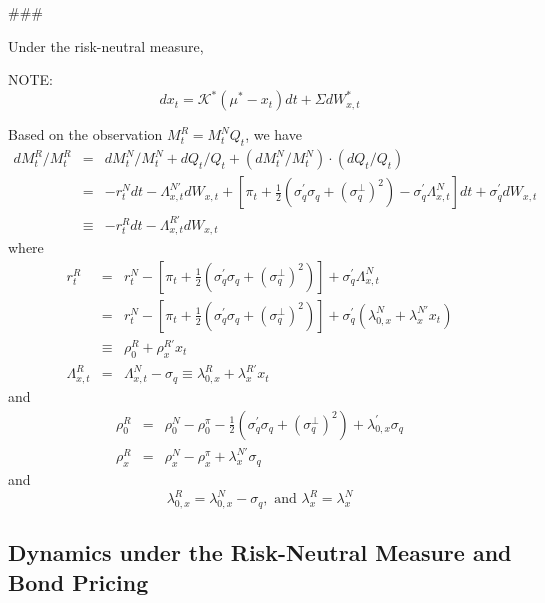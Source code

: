 \documentclass{article}
\begin{document}
\#\#\#

Under the risk-neutral measure,

NOTE:\ 
\begin{equation*}
dx_{t}=\mathcal{K}^{\ast }\left( \mu ^{\ast }-x_{t}\right) dt+\Sigma
dW_{x,t}^{\ast }
\end{equation*}

Based on the observation $M_{t}^{R}=M_{t}^{N}Q_{t}$, we have%
\begin{eqnarray*}
dM_{t}^{R}/M_{t}^{R} &=&dM_{t}^{N}/M_{t}^{N}+dQ_{t}/Q_{t}+\left(
dM_{t}^{N}/M_{t}^{N}\right) \cdot \left( dQ_{t}/Q_{t}\right) \\
&=&-r_{t}^{N}dt-\Lambda _{x,t}^{N\prime }dW_{x,t}+\left[ \pi _{t}+\frac{1}{2}%
\left( \sigma _{q}^{\prime }\sigma _{q}+\left( \sigma _{q}^{\bot }\right)
^{2}\right) -\sigma _{q}^{\prime }\Lambda _{x,t}^{N}\right] dt+\sigma
_{q}^{\prime }dW_{x,t} \\
&\equiv &-r_{t}^{R}dt-\Lambda _{x,t}^{R\prime }dW_{x,t}
\end{eqnarray*}%
where 
\begin{eqnarray*}
r_{t}^{R} &=&r_{t}^{N}-\left[ \pi _{t}+\frac{1}{2}\left( \sigma _{q}^{\prime
}\sigma _{q}+\left( \sigma _{q}^{\bot }\right) ^{2}\right) \right] +\sigma
_{q}^{\prime }\Lambda _{x,t}^{N} \\
&=&r_{t}^{N}-\left[ \pi _{t}+\frac{1}{2}\left( \sigma _{q}^{\prime }\sigma
_{q}+\left( \sigma _{q}^{\bot }\right) ^{2}\right) \right] +\sigma
_{q}^{\prime }\left( \lambda _{0,x}^{N}+\lambda _{x}^{N\prime }x_{t}\right)
\\
&\equiv &\rho _{0}^{R}+\rho _{x}^{R\prime }x_{t} \\
\Lambda _{x,t}^{R} &=&\Lambda _{x,t}^{N}-\sigma _{q}\equiv \lambda
_{0,x}^{R}+\lambda _{x}^{R\prime }x_{t}
\end{eqnarray*}%
and%
\begin{eqnarray*}
\rho _{0}^{R} &=&\rho _{0}^{N}-\rho _{0}^{\pi }-\frac{1}{2}\left( \sigma
_{q}^{\prime }\sigma _{q}+\left( \sigma _{q}^{\bot }\right) ^{2}\right)
+\lambda _{0,x}^{\prime }\sigma _{q} \\
\rho _{x}^{R} &=&\rho _{x}^{N}-\rho _{x}^{\pi }+\lambda _{x}^{N\prime
}\sigma _{q}
\end{eqnarray*}%
and 
\begin{equation*}
\lambda _{0,x}^{R}=\lambda _{0,x}^{N}-\sigma _{q},\text{ and }\lambda
_{x}^{R}=\lambda _{x}^{N}
\end{equation*}

\subsection{Dynamics under the Risk-Neutral Measure and Bond Pricing}
\end{document}
